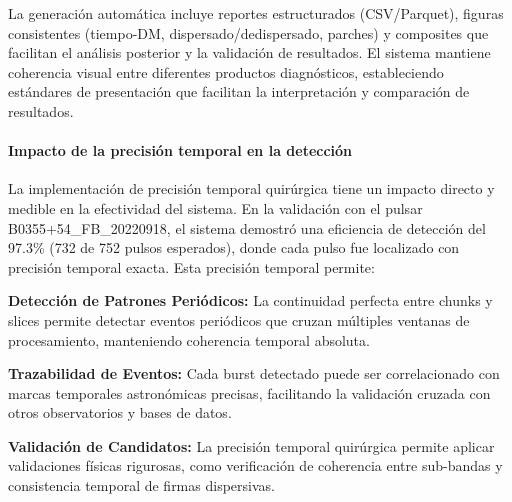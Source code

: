 La generación automática incluye reportes estructurados (CSV/Parquet), figuras consistentes (tiempo-DM, dispersado/dedispersado, parches) y composites que facilitan el análisis posterior y la validación de resultados. El sistema mantiene coherencia visual entre diferentes productos diagnósticos, estableciendo estándares de presentación que facilitan la interpretación y comparación de resultados.

\paragraph{Impacto de la precisión temporal en la detección}

La implementación de precisión temporal quirúrgica tiene un impacto directo y medible en la efectividad del sistema. En la validación con el pulsar B0355+54\_FB\_20220918, el sistema demostró una eficiencia de detección del 97.3\% (732 de 752 pulsos esperados), donde cada pulso fue localizado con precisión temporal exacta. Esta precisión temporal permite:

\textbf{Detección de Patrones Periódicos:} La continuidad perfecta entre chunks y slices permite detectar eventos periódicos que cruzan múltiples ventanas de procesamiento, manteniendo coherencia temporal absoluta.

\textbf{Trazabilidad de Eventos:} Cada burst detectado puede ser correlacionado con marcas temporales astronómicas precisas, facilitando la validación cruzada con otros observatorios y bases de datos.

\textbf{Validación de Candidatos:} La precisión temporal quirúrgica permite aplicar validaciones físicas rigurosas, como verificación de coherencia entre sub-bandas y consistencia temporal de firmas dispersivas.

